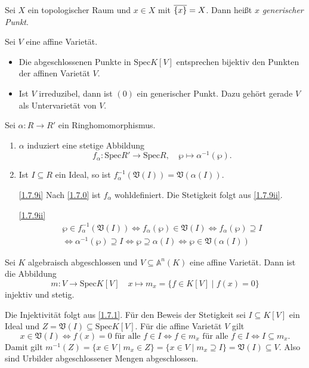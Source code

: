 \documentclass[a4paper,12pt]{scrbook}
\makeatletter
\theoremstyle{blah}
\theoremstyle{stz}
\renewcommand{\proofname}{Beweis}
\renewenvironment{proof}[1][\proofname]{\par
  \pushQED{\qed}%
  \normalfont \topsep6\p@\@plus6\p@\relax
  \trivlist
  \item[\hskip\labelsep
        \itshape
    #1\@addpunct{:}]\ignorespaces
}{%
  \popQED\endtrivlist\@endpefalse
}
\def\A{\mathbb{A}}
\def\V{\mathfrak{V}}
\newcommand{\Spec}{\mathrm{Spec}}
\newcommand{\ra}{\longrightarrow}
\renewcommand{\mapsto}{\longmapsto}
\def\Bar#1{\ensuremath\overline{#1}}
\makeatother
\begin{document}
\begin{bem}\label{1.7.7}
  Sei $X$ ein topologischer Raum und $x\in X$ mit $\Bar{\{x\}}=X$. Dann heißt $x$ \emph{generischer Punkt}.
\end{bem}

\begin{bsp}\label{1.7.8}
  Sei $V$ eine affine Varietät.
  \begin{itemize}
  \item Die abgeschlossenen Punkte in $\Spec K[V]$ entsprechen bijektiv den Punkten der affinen Varietät $V$.
  \item Ist $V$ irreduzibel, dann ist $(0)$ ein generischer Punkt. Dazu gehört gerade $V$ als Untervarietät von $V$.
  \end{itemize}
\end{bsp}


\begin{bem}\label{1.7.9}
  Sei $\alpha\colon R\ra R'$ ein Ringhomomorphismus.
  \begin{enumerate}
  \item\label{1.7.9i} $\alpha$ induziert eine stetige Abbildung \[ f_\alpha\colon \Spec R'\ra\Spec R,\quad
    \wp\mapsto\alpha^{-1}(\wp). \]
  \item\label{1.7.9ii} Ist $I\subseteq R$ ein Ideal, so ist $f_\alpha^{-1}(\V(I))=\V(\alpha(I))$.
  \end{enumerate}
\end{bem}
\begin{proof}
  \begin{enumerate}
  \item[\ref{1.7.9i}] Nach \ref{1.7.0} ist $f_\alpha$ wohldefiniert. Die Stetigkeit folgt aus \ref{1.7.9ii}.
  \item[\ref{1.7.9ii}]
    \begin{multline*}
      \wp\in f_\alpha^{-1}(\V(I)) \iff f_\alpha(\wp)\in\V(I) \iff f_\alpha(\wp)\supseteq I \\
      \iff \alpha^{-1}(\wp)\supseteq I \iff \wp\supseteq\alpha(I) \iff \wp\in\V(\alpha(I))
    \end{multline*}
  \end{enumerate}
\end{proof}

\begin{prop}\label{1.7.10}
  Sei $K$ algebraisch abgeschlossen und $V\subseteq\A^n(K)$ eine affine Varietät. Dann ist die Abbildung
  \[ m\colon V\ra \Spec K[V] \quad x\mapsto m_x=\{f\in K[V]\mid f(x)=0\} \]
  injektiv und stetig.
\end{prop}
\begin{proof}
  Die Injektivität folgt aus \autoref{1.7.1}. Für den Beweis der Stetigkeit sei $I\subseteq K[V]$ ein Ideal und
  $Z=\V(I)\subseteq\Spec K[V]$. Für die affine
  Varietät $V$ gilt
  \[x\in\V(I) \iff f(x)=0 \text{ für alle }f\in I \iff f\in m_x \text{ für alle }f\in I \iff I\subseteq m_x. \]
  Damit gilt $m^{-1}(Z)=\{x\in V\mid m_x\in Z\}=\{x\in V\mid m_x\supseteq I\}=\V(I)\subseteq V$. Also sind Urbilder
  abgeschlossener Mengen abgeschlossen.
\end{proof}
\end{document}
